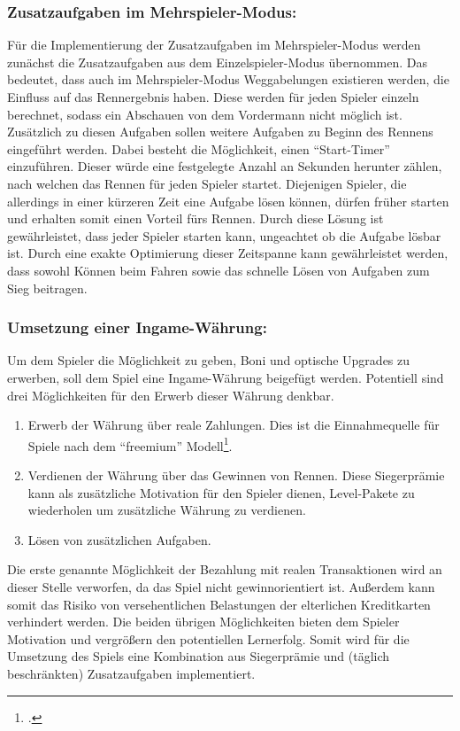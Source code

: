 	\subsubsection*{Zusatzaufgaben im Mehrspieler-Modus:}
		Für die Implementierung der Zusatzaufgaben im Mehrspieler-Modus werden zunächst die Zusatzaufgaben aus dem Einzelspieler-Modus übernommen. Das bedeutet, dass auch im Mehrspieler-Modus Weggabelungen existieren werden, die Einfluss auf das Rennergebnis haben. Diese werden für jeden Spieler einzeln berechnet, sodass ein Abschauen von dem Vordermann nicht möglich ist. Zusätzlich zu diesen Aufgaben sollen weitere Aufgaben zu Beginn des Rennens eingeführt werden. Dabei besteht die Möglichkeit, einen \enquote{Start-Timer} einzuführen. Dieser würde eine festgelegte Anzahl an Sekunden herunter zählen, nach welchen das Rennen für jeden Spieler startet. Diejenigen Spieler, die allerdings in einer kürzeren Zeit eine Aufgabe lösen können, dürfen früher starten und erhalten somit einen Vorteil fürs Rennen.
		Durch diese Lösung ist gewährleistet, dass jeder Spieler starten kann, ungeachtet ob die Aufgabe lösbar ist. Durch eine exakte Optimierung dieser Zeitspanne kann gewährleistet werden, dass sowohl Können beim Fahren sowie das schnelle Lösen von Aufgaben zum Sieg beitragen.

	\subsubsection*{Umsetzung einer Ingame-Währung:}
		Um dem Spieler die Möglichkeit zu geben, Boni und optische Upgrades zu erwerben, soll dem Spiel eine Ingame-Währung beigefügt werden. Potentiell sind drei Möglichkeiten für den Erwerb dieser Währung denkbar.
		\begin{enumerate}
			\item{ Erwerb der Währung über reale Zahlungen. Dies ist die Einnahmequelle für Spiele nach dem \enquote{freemium} Modell\footcite[Seite 8]{freemium}. }
			\item{ Verdienen der Währung über das Gewinnen von Rennen. Diese Siegerprämie kann als zusätzliche Motivation für den Spieler dienen, Level-Pakete zu wiederholen um zusätzliche Währung zu verdienen. }
			\item{ Lösen von zusätzlichen Aufgaben. }
		\end{enumerate}
		Die erste genannte Möglichkeit der Bezahlung mit realen Transaktionen wird an dieser Stelle verworfen, da das Spiel nicht gewinnorientiert ist. Außerdem kann somit das Risiko von versehentlichen Belastungen der elterlichen Kreditkarten verhindert werden.
		Die beiden übrigen Möglichkeiten bieten dem Spieler Motivation und vergrößern den potentiellen Lernerfolg. Somit wird für die Umsetzung des Spiels eine Kombination aus Siegerprämie und (täglich beschränkten) Zusatzaufgaben implementiert.

